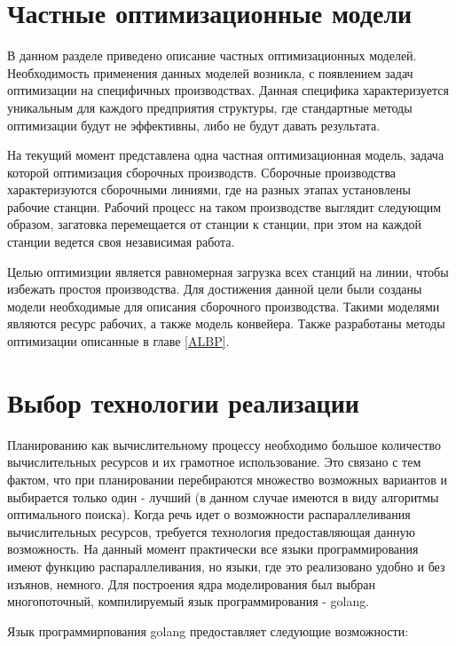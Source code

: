 \section{Частные оптимизационные модели}

В данном разделе приведено описание частных оптимизационных моделей. Необходимость применения данных моделей возникла, с появлением задач оптимизации на специфичных производствах. Данная специфика характеризуется уникальным для каждого предприятия структуры, где стандартные методы оптимизации будут не эффективны, либо не будут давать результата.

На текущий момент представлена одна частная оптимизационная модель, задача которой оптимизация сборочных производств. Сборочные производства характеризуются сборочными линиями, где на разных этапах установлены рабочие станции. Рабочий процесс на таком производстве выглядит следующим образом, загатовка перемещается от станции к станции, при этом на каждой станции ведется своя независимая работа.

Целью оптимизции является равномерная загрузка всех станций на линии, чтобы избежать простоя производства. Для достижения данной цели были созданы модели необходимые для описания сборочного производства. Такими моделями являются ресурс рабочих, а также модель конвейера. Также разработаны методы оптимизации описанные в главе \ref{ALBP}.

\section{Выбор технологии реализации}

Планированию как вычислительному процессу необходимо большое количество вычислительных ресурсов и их грамотное использование. Это связано с тем фактом, что при планировании перебираются множество возможных вариантов и выбирается только один - лучший (в данном случае имеются в виду алгоритмы оптимального поиска). Когда речь идет о возможности распараллеливания вычислительных ресурсов, требуется технология предоставляющая данную возможность. На данный момент практически все языки программирования имеют функцию распараллеливания, но языки, где это реализовано удобно и без изъянов, немного.  Для построения ядра моделирования был выбран многопоточный, компилируемый язык программирования - golang.

Язык программирпования golang предоставляет следующие возможности:

